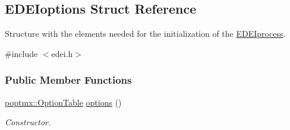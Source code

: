 \hypertarget{structEDEIoptions}{
\subsection{EDEIoptions Struct Reference}
\label{structEDEIoptions}
}


Structure with the elements needed for the initialization of the \hyperlink{classEDEIprocess}{EDEIprocess}.  




{\ttfamily \#include $<$edei.h$>$}

\subsubsection*{Public Member Functions}
\begin{DoxyCompactItemize}
\item 
\hyperlink{classpoptmx_1_1OptionTable}{poptmx::OptionTable} \hyperlink{group__edeiedei_gae31714a01a177e8ada6450dbd5a343cc}{options} ()
\begin{DoxyCompactList}\small\item\em Constructor. \item\end{DoxyCompactList}\end{DoxyCompactItemize}
